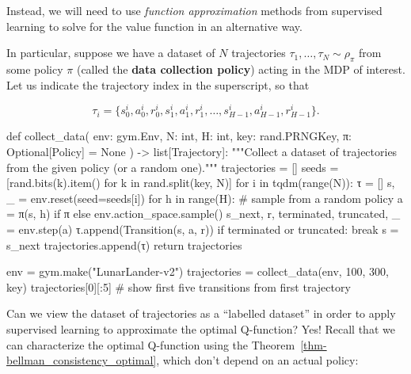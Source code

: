 \documentclass[
  letterpaper,
  DIV=11,
  numbers=noendperiod]{scrreprt}
\newenvironment{Shaded}{\begin{snugshade}}{\end{snugshade}}
\newcommand{\NormalTok}[1]{\textcolor[rgb]{0.00,0.23,0.31}{#1}}
\theoremstyle{plain}
\theoremstyle{plain}
\theoremstyle{definition}
\theoremstyle{definition}
\theoremstyle{remark}
\begin{document}
Instead, we will need to use \emph{function approximation} methods from
supervised learning to solve for the value function in an alternative
way.

In particular, suppose we have a dataset of \(N\) trajectories
\(\tau_1, \dots, \tau_N \sim \rho_{\pi}\) from some policy \(\pi\)
(called the \textbf{data collection policy}) acting in the MDP of
interest. Let us indicate the trajectory index in the superscript, so
that

\[
\tau_i = \{ s_0^i, a_0^i, r_0^i, s_1^i, a_1^i, r_1^i, \dots, s_{H-1}^i, a_{H-1}^i, r_{H-1}^i \}.
\]

\begin{Shaded}
\begin{Highlighting}[]
\NormalTok{def collect\_data(}
\NormalTok{    env: gym.Env, N: int, H: int, key: rand.PRNGKey, π: Optional[Policy] = None}
\NormalTok{) {-}\textgreater{} list[Trajectory]:}
\NormalTok{    """Collect a dataset of trajectories from the given policy (or a random one)."""}
\NormalTok{    trajectories = []}
\NormalTok{    seeds = [rand.bits(k).item() for k in rand.split(key, N)]}
\NormalTok{    for i in tqdm(range(N)):}
\NormalTok{        τ = []}
\NormalTok{        s, \_ = env.reset(seed=seeds[i])}
\NormalTok{        for h in range(H):}
\NormalTok{            \# sample from a random policy}
\NormalTok{            a = π(s, h) if π else env.action\_space.sample()}
\NormalTok{            s\_next, r, terminated, truncated, \_ = env.step(a)}
\NormalTok{            τ.append(Transition(s, a, r))}
\NormalTok{            if terminated or truncated:}
\NormalTok{                break}
\NormalTok{            s = s\_next}
\NormalTok{        trajectories.append(τ)}
\NormalTok{    return trajectories}
\end{Highlighting}
\end{Shaded}

\begin{Shaded}
\begin{Highlighting}[]
\NormalTok{env = gym.make("LunarLander{-}v2")}
\NormalTok{trajectories = collect\_data(env, 100, 300, key)}
\NormalTok{trajectories[0][:5]  \# show first five transitions from first trajectory}
\end{Highlighting}
\end{Shaded}

Can we view the dataset of trajectories as a ``labelled dataset'' in
order to apply supervised learning to approximate the optimal
Q-function? Yes! Recall that we can characterize the optimal Q-function
using the Theorem~\ref{thm-bellman_consistency_optimal}, which don't
depend on an actual policy:
\end{document}

